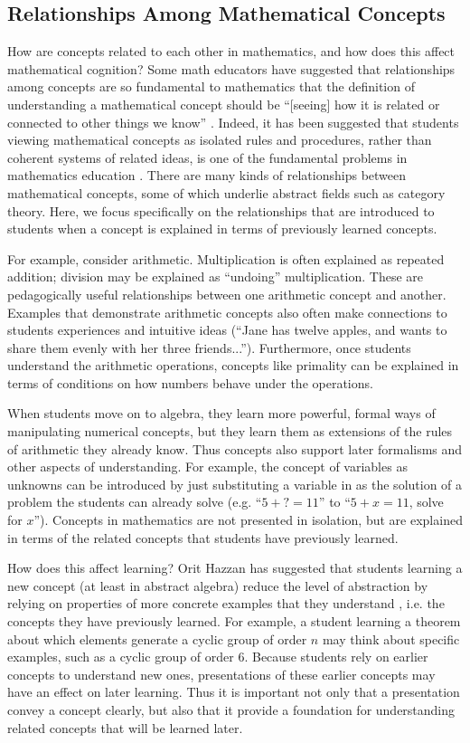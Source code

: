 \documentclass[man,10pt]{apa6}
\begin{document}
\subsection{Relationships Among Mathematical Concepts}
How are concepts related to each other in mathematics, and how does this affect mathematical cognition? Some math educators have suggested that relationships among concepts are so fundamental to mathematics that the definition of understanding a mathematical concept should be ``[seeing] how it is related or connected to other things we know'' \cite{Hiebert1997}. Indeed, it has been suggested that students viewing mathematical concepts as isolated rules and procedures, rather than coherent systems of related ideas, is one of the fundamental problems in mathematics education \cite{Richland2012}. There are many kinds of relationships between mathematical concepts, some of which underlie abstract fields such as category theory. Here, we focus specifically on the relationships that are introduced to students when a concept is explained in terms of previously learned concepts. \par 
For example, consider arithmetic. Multiplication is often explained as repeated addition; division may be explained as ``undoing'' multiplication. These are pedagogically useful relationships between one arithmetic concept and another. Examples that demonstrate arithmetic concepts also often make connections to students experiences and intuitive ideas (``Jane has twelve apples, and wants to share them evenly with her three friends...''). Furthermore, once students understand the arithmetic operations, concepts like primality can be explained in terms of conditions on how numbers behave under the operations. \par
When students move on to algebra, they learn more powerful, formal ways of manipulating numerical concepts, but they learn them as extensions of the rules of arithmetic they already know. Thus concepts also support later formalisms and other aspects of understanding. For example, the concept of variables as unknowns can be introduced by just substituting a variable in as the solution of a problem the students can already solve (e.g. ``$5+?=11$'' to ``$5+x=11$, solve for $x$''). Concepts in mathematics are not presented in isolation, but are explained in terms of the related concepts that students have previously learned. \par 
How does this affect learning? Orit Hazzan has suggested that students learning a new concept (at least in abstract algebra) reduce the level of abstraction by relying on properties of more concrete examples that they understand \cite{Hazzan1999}, i.e. the concepts they have previously learned. For example, a student learning a theorem about which elements generate a cyclic group of order $n$ may think about specific examples, such as a cyclic group of order 6. Because students rely on earlier concepts to understand new ones, presentations of these earlier concepts may have an effect on later learning. Thus it is important not only that a presentation convey a concept clearly, but also that it provide a foundation for understanding related concepts that will be learned later. \par
\end{document}
